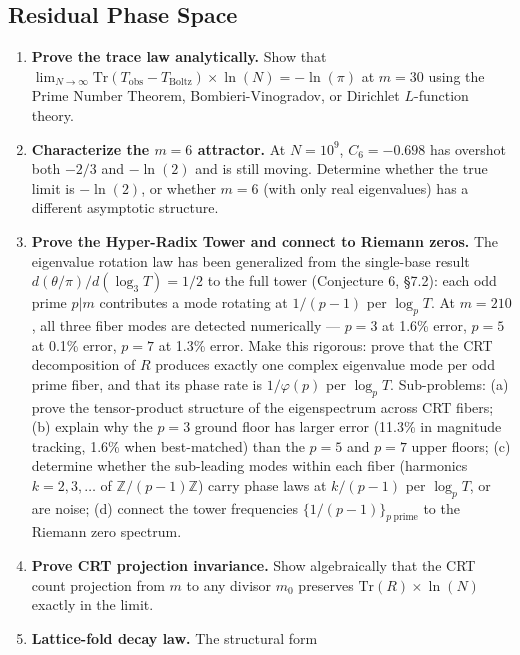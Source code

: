 \documentclass[
  11pt,
]{article}
\numberwithin{equation}{section}
\begin{document}
\subsection{Residual Phase Space}\label{residual-phase-space}

\begin{enumerate}
\def\labelenumi{\arabic{enumi}.}
\item
  \textbf{Prove the trace law analytically.} Show that
  \(\lim_{N \to \infty} \text{Tr}(T_{\text{obs}} - T_{\text{Boltz}}) \times \ln(N) = -\ln(\pi)\)
  at \(m = 30\) using the Prime Number Theorem, Bombieri-Vinogradov, or
  Dirichlet \(L\)-function theory.
\item
  \textbf{Characterize the \(m = 6\) attractor.} At \(N = 10^9\),
  \(C_6 = -0.698\) has overshot both \(-2/3\) and \(-\ln(2)\) and is
  still moving. Determine whether the true limit is \(-\ln(2)\), or
  whether \(m = 6\) (with only real eigenvalues) has a different
  asymptotic structure.
\item
  \textbf{Prove the Hyper-Radix Tower and connect to Riemann zeros.} The
  eigenvalue rotation law has been generalized from the single-base
  result \(d(\theta/\pi)/d(\log_3 T) = 1/2\) to the full tower
  (Conjecture 6, §7.2): each odd prime \(p | m\) contributes a mode
  rotating at \(1/(p-1)\) per \(\log_p T\). At \(m = 210\), all three
  fiber modes are detected numerically --- \(p = 3\) at 1.6\% error,
  \(p = 5\) at 0.1\% error, \(p = 7\) at 1.3\% error. Make this
  rigorous: prove that the CRT decomposition of \(R\) produces exactly
  one complex eigenvalue mode per odd prime fiber, and that its phase
  rate is \(1/\varphi(p)\) per \(\log_p T\). Sub-problems: (a) prove the
  tensor-product structure of the eigenspectrum across CRT fibers; (b)
  explain why the \(p = 3\) ground floor has larger error (11.3\% in
  magnitude tracking, 1.6\% when best-matched) than the \(p = 5\) and
  \(p = 7\) upper floors; (c) determine whether the sub-leading modes
  within each fiber (harmonics \(k = 2, 3, \ldots\) of
  \(\mathbb{Z}/(p{-}1)\mathbb{Z}\)) carry phase laws at \(k/(p-1)\) per
  \(\log_p T\), or are noise; (d) connect the tower frequencies
  \(\{1/(p-1)\}_{p\ \text{prime}}\) to the Riemann zero spectrum.
\item
  \textbf{Prove CRT projection invariance.} Show algebraically that the
  CRT count projection from \(m\) to any divisor \(m_0\) preserves
  \(\text{Tr}(R) \times \ln(N)\) exactly in the limit.
\item
  \textbf{Lattice-fold decay law.} The structural form

\end{enumerate}
\end{document}
